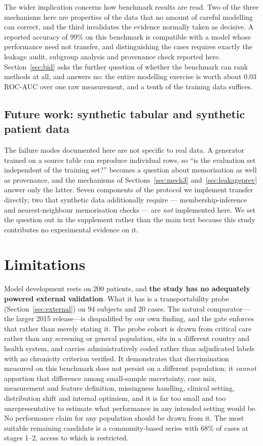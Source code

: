 \documentclass[conference]{IEEEtran}
\begin{document}
The wider implication concerns how benchmark results are read. Two of the
three mechanisms here are properties of the data that no amount of careful
modelling can correct, and the third invalidates the evidence normally taken
as decisive. A reported accuracy of 99\% on this benchmark is compatible with
a model whose performance need not transfer, and distinguishing the cases
requires exactly the leakage audit, subgroup analysis and provenance check
reported here. Section~\ref{sec:bid} asks the further question of whether the
benchmark can rank methods at all, and answers no: the entire modelling
exercise is worth about 0.03 ROC-AUC over one raw measurement, and a tenth of
the training data suffices.

\subsection{Future work: synthetic tabular and synthetic patient data}
\label{sec:synthetic}

The failure modes documented here are not specific to real data. A
generator trained on a source table can reproduce individual rows, so
``is the evaluation set independent of the training set?'' becomes a
question about memorisation as well as provenance, and the mechanisms of
Sections~\ref{sec:mech3} and~\ref{sec:leakageprev} answer only the
latter. Seven components of the protocol we implement transfer directly;
two that synthetic data additionally require --- membership-inference and
nearest-neighbour memorisation checks --- are \emph{not} implemented
here. We set the question out in the supplement rather than the main
text because this study contributes no experimental evidence on it.

\section{Limitations}

Model development rests on 200 patients, and \textbf{the study has no
adequately powered external validation}. What it has is a transportability
probe (Section~\ref{sec:external}) on 94 subjects and 20 cases. The natural
comparator---the larger 2015 release---is disqualified by our own finding,
and the gate enforces that rather than merely stating it. The probe cohort is
drawn from critical care rather than any screening or general population,
sits in a different country and health system, and carries administratively
coded rather than adjudicated labels with no chronicity criterion verified.
It demonstrates that discrimination measured on this benchmark does not
persist on a different population; it \emph{cannot} apportion that difference
among small-sample uncertainty, case mix, measurement and feature definition,
missingness handling, clinical setting, distribution shift and internal
optimism, and it is far too small and too unrepresentative to estimate what
performance in any intended setting would be. No performance claim for any
population should be drawn from it. The most suitable remaining candidate is
a community-based series with 68\% of cases at stages 1--2, access to which
is restricted.
\end{document}
